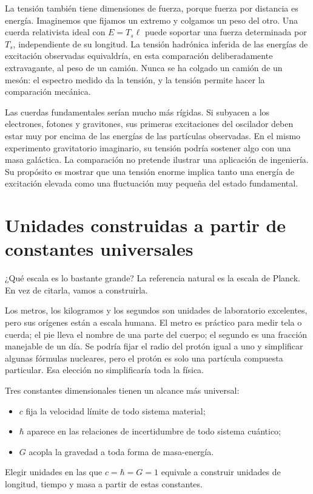 La tensión también tiene dimensiones de fuerza, porque fuerza por distancia es energía. Imaginemos que fijamos un extremo y colgamos un peso del otro. Una cuerda relativista ideal con \(E=T_s\ell\) puede soportar una fuerza determinada por \(T_s\), independiente de su longitud. La tensión hadrónica inferida de las energías de excitación observadas equivaldría, en esta comparación deliberadamente extravagante, al peso de un camión. Nunca se ha colgado un camión de un mesón: el espectro medido da la tensión, y la tensión permite hacer la comparación mecánica.

Las cuerdas fundamentales serían mucho más rígidas. Si subyacen a los electrones, fotones y gravitones, sus primeras excitaciones del oscilador deben estar muy por encima de las energías de las partículas observadas. En el mismo experimento gravitatorio imaginario, su tensión podría sostener algo con una masa galáctica. La comparación no pretende ilustrar una aplicación de ingeniería. Su propósito es mostrar que una tensión enorme implica tanto una energía de excitación elevada como una fluctuación muy pequeña del estado fundamental.

\section{Unidades construidas a partir de constantes universales}

¿Qué escala es lo bastante grande? La referencia natural es la escala de Planck. En vez de citarla, vamos a construirla.

Los metros, los kilogramos y los segundos son unidades de laboratorio excelentes, pero sus orígenes están a escala humana. El metro es práctico para medir tela o cuerda; el pie lleva el nombre de una parte del cuerpo; el segundo es una fracción manejable de un día. Se podría fijar el radio del protón igual a uno y simplificar algunas fórmulas nucleares, pero el protón es solo una partícula compuesta particular. Esa elección no simplificaría toda la física.

Tres constantes dimensionales tienen un alcance más universal: \begin{itemize}\item \(c\) fija la velocidad límite de todo sistema material; \item \(\hbar\) aparece en las relaciones de incertidumbre de todo sistema cuántico; \item \(G\) acopla la gravedad a toda forma de masa-energía.\end{itemize} Elegir unidades en las que \(c=\hbar=G=1\) equivale a construir unidades de longitud, tiempo y masa a partir de estas constantes.

